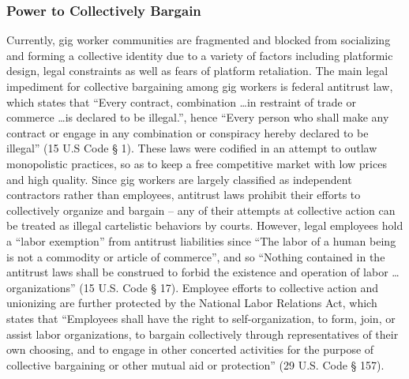 \subsubsection{Power to Collectively Bargain}
Currently, gig worker communities are fragmented and blocked from socializing and forming a collective identity due to a variety of factors including platformic design, legal constraints as well as fears of platform retaliation. The main legal impediment for collective bargaining among gig workers is federal antitrust law, which states that ``Every contract, combination \dots in restraint of trade or commerce \dots is declared to be illegal.'', hence ``Every person who shall make any contract or engage in any combination or conspiracy hereby declared to be illegal'' (15 U.S Code § 1). These laws were codified in an attempt to outlaw monopolistic practices, so as to keep a free competitive market with low prices and high quality. Since gig workers are largely classified as independent contractors rather than employees, antitrust laws prohibit their efforts to collectively organize and bargain – any of their attempts at collective action can be treated as illegal cartelistic behaviors by courts. However, legal employees hold a ``labor exemption'' from antitrust liabilities since ``The labor of a human being is not a commodity or article of commerce'', and so ``Nothing contained in the antitrust laws shall be construed to forbid the existence and operation of labor \dots organizations'' (15 U.S. Code § 17). Employee efforts to collective action and unionizing are further protected by the National Labor Relations Act, which states that ``Employees shall have the right to self-organization, to form, join, or assist labor organizations, to bargain collectively through representatives of their own choosing, and to engage in other concerted activities for the purpose of collective bargaining or other mutual aid or protection'' (29 U.S. Code § 157). 

